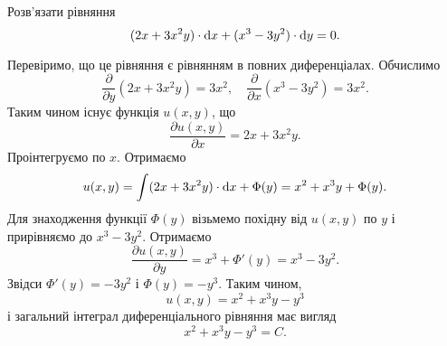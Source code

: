 \begin{example}
	Розв’язати рівняння \[(2x + 3x^2y) \cdot \mathop{}\!\mathrm{d} x + (x^3 - 3y^2) \cdot \mathop{}\!\mathrm{d} y = 0.\]
\end{example}
\begin{solution}
	Перевіримо, що це рівняння є рівнянням в повних диференціалах. Обчислимо
	\[ \frac{\partial}{\partial y} (2x + 3x^2y) = 3x^2, \quad \frac{\partial}{\partial x} (x^3 - 3y^2) = 3x^2. \]
	Таким чином існує функція $u(x,y)$, що \[\frac{\partial u(x,y)}{\partial x} = 2x + 3x^2y.\] Проінтегруємо по $x$. Отримаємо
	\[ u(x,y) = \int(2x+3x^2y)\cdot\mathop{}\!\mathrm{d} x+\Phi(y)=x^2+x^3y+\Phi(y).\]
	Для знаходження функції $\Phi(y)$ візьмемо похідну від $u(x,y)$ по $y$ і прирівняємо до $x^3-3y^2$. Отримаємо
	\[ \frac{\partial u(x,y)}{\partial y} = x^3 + \Phi'(y) = x^3 - 3y^2.\]
	Звідси $\Phi'(y) = -3y^2$ і $\Phi(y) = -y^3$. Таким чином, \[u(x,y)=x^2+x^3y-y^3\] і загальний інтеграл диференціального рівняння має вигляд \[x^2+x^3y-y^3=C.\]
\end{solution}

